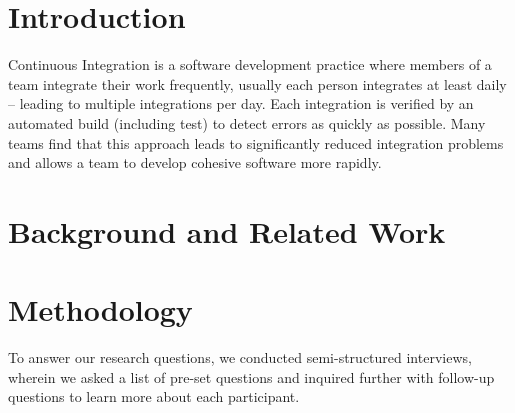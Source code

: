 \documentclass{sig-alternate-05-2015}
\begin{document}


\section{Introduction}
Continuous Integration is a software development practice where members of a team integrate their work frequently, usually each person integrates at least daily -- leading to multiple integrations per day. Each integration is verified by an automated build (including test) to detect errors as quickly as possible. Many teams find that this approach leads to significantly reduced integration problems and allows a team to develop cohesive software more rapidly.\cite{fowler:continuous}

\section{Background and Related Work}
\section{Methodology}
To answer our research questions, we conducted semi-structured interviews, wherein we asked a list of pre-set questions and inquired further with follow-up questions to learn more about each participant. \\
\end{document}
